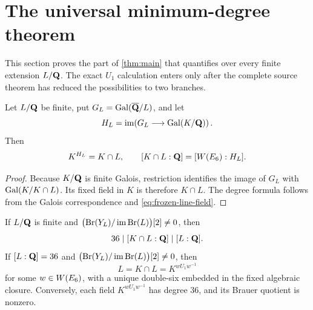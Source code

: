 \section{The universal minimum-degree theorem}
\label{sec:minimal-degree}

This section proves the part of \cref{thm:main} that quantifies over every
finite extension \(L/\mathbf Q\).  The exact \(U_1\) calculation enters only after
the complete source theorem has reduced the possibilities to two branches.

\begin{lemma}
\label{lem:intersection-fixed-field}
Let \(L/\mathbf Q\) be finite, put \(G_L=\operatorname{Gal}(\overline{\mathbf Q}/L)\), and let
\begin{equation}
 H_L=\operatorname{im}\!\left(G_L\longrightarrow\operatorname{Gal}(K/\mathbf Q)\right).
\label{eq:def-HL}
\end{equation}
Then
\[
 K^{H_L}=K\cap L,\qquad
 [K\cap L:\mathbf Q]=[W(E_6):H_L].
\]
\end{lemma}

\begin{proof}
Because \(K/\mathbf Q\) is finite Galois, restriction identifies the image of
\(G_L\) with \(\operatorname{Gal}(K/K\cap L)\).  Its fixed field in \(K\) is therefore
\(K\cap L\).  The degree formula follows from the Galois correspondence and
\cref{eq:frozen-line-field}.
\end{proof}

\begin{theorem}
\label{thm:degree}
If \(L/\mathbf Q\) is finite and \(\bigl(\operatorname{Br}(Y_{L})/\operatorname{im}\operatorname{Br}(L)\bigr)[2]\ne0\), then
\begin{equation}
 36\mid[K\cap L:\mathbf Q]\mid[L:\mathbf Q].
\label{eq:degree-chain}
\end{equation}
If \([L:\mathbf Q]=36\) and \(\bigl(\operatorname{Br}(Y_{L})/\operatorname{im}\operatorname{Br}(L)\bigr)[2]\ne0\), then
\begin{equation}
 L=K\cap L=K^{wU_1w^{-1}}
\label{eq:equality-field}
\end{equation}
for some \(w\in W(E_6)\), with a unique double-six embedded in the fixed
algebraic closure.  Conversely, each field \(K^{wU_1w^{-1}}\) has degree
\(36\), and its Brauer quotient is nonzero.
\end{theorem}

